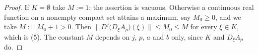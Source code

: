 \begin{proof}
If $K=\emptyset$ take $M:=1$; the assertion is vacuous.  Otherwise a continuous real function
on a nonempty compact set attains a maximum, say $M_0\ge0$, and we take $M:=M_0+1>0$.  Then
$\bigl\lVert D^{j}\bigl(D_\xi A_p\bigr)(\xi)\bigr\rVert\le M_0\le M$ for every $\xi\in K$,
which is (5).  The constant $M$ depends on $j$, $p$, $a$ and $b$ only, since $K$ and
$D_\xi A_p$ do.
\end{proof}
